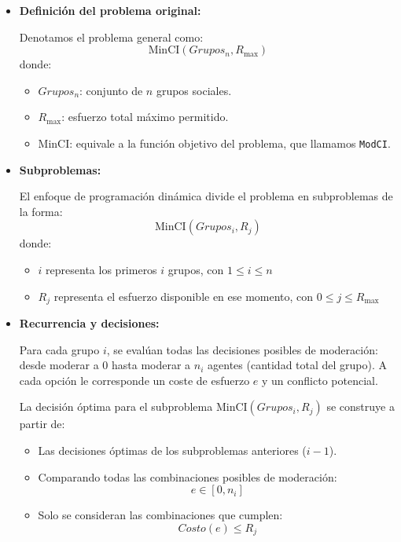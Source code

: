 \documentclass[11pt,letter]{article}
\begin{document}
    \begin{itemize}
        \item \textbf{Definición del problema original:}

        Denotamos el problema general como:
        \[
            \text{MinCI}(Grupos_n, R_{\text{max}})
        \]
        donde:
        \begin{itemize}
            \item $Grupos_n$: conjunto de $n$ grupos sociales.
            \item $R_{\text{max}}$: esfuerzo total máximo permitido.
            \item $\text{MinCI}$: equivale a la función objetivo del problema, que llamamos \texttt{ModCI}.
        \end{itemize}

        \item \textbf{Subproblemas:}

        El enfoque de programación dinámica divide el problema en subproblemas de la forma:
        \[
            \text{MinCI}(Grupos_i, R_j)
        \]
        donde:
        \begin{itemize}
            \item $i$ representa los primeros $i$ grupos, con $1 \leq i \leq n$
            \item $R_j$ representa el esfuerzo disponible en ese momento, con $0 \leq j \leq R_{\text{max}}$
        \end{itemize}

        \item \textbf{Recurrencia y decisiones:}

        Para cada grupo $i$, se evalúan todas las decisiones posibles de moderación: desde moderar a $0$ hasta moderar a $n_i$ agentes (cantidad total del grupo). A cada opción le corresponde un coste de esfuerzo $e$ y un conflicto potencial.

        La decisión óptima para el subproblema $\text{MinCI}(Grupos_i, R_j)$ se construye a partir de:
        \begin{itemize}
            \item Las decisiones óptimas de los subproblemas anteriores ($i - 1$).
            \item Comparando todas las combinaciones posibles de moderación:
            \[
                e \in [0, n_i]
            \]
            \item Solo se consideran las combinaciones que cumplen:
            \[
                Costo(e) \leq R_j
            \]
        \end{itemize}


\end{itemize}
\end{document}
